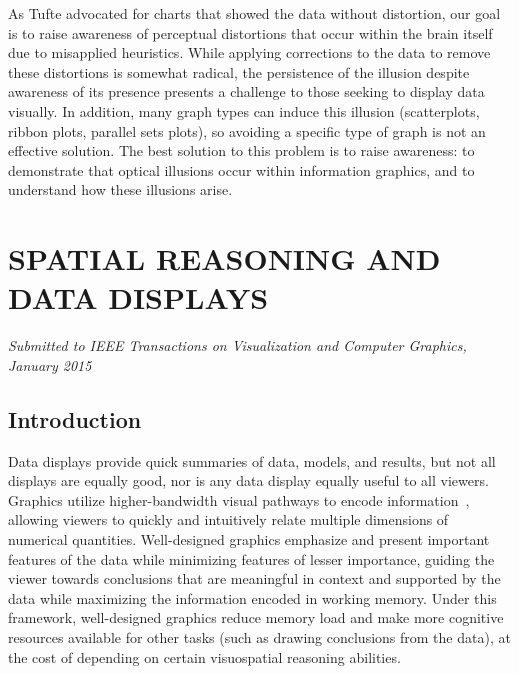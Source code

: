 \documentclass[11pt]{isuthesis}\usepackage[]{graphicx}\usepackage[]{color}
\begin{document}
As Tufte advocated for charts that showed the data without distortion, our goal is to raise awareness of perceptual distortions that occur within the brain itself due to misapplied heuristics. While applying corrections to the data to remove these distortions is somewhat radical, the persistence of the illusion despite awareness of its presence presents a challenge to those seeking to display data visually. In addition, many graph types can induce this illusion (scatterplots, ribbon plots, parallel sets plots), so avoiding a specific type of graph is not an effective solution. The best solution to this problem is to raise awareness: to demonstrate that optical illusions occur within information graphics, and to understand how these illusions arise.  













\graphicspath{{Figure/VisualAptitude/}{../Figure/VisualAptitude/}{Images/VisualAptitude/}{../Images/VisualAptitude/}}
\renewcommand{\floatpagefraction}{.99}




\chapter{SPATIAL REASONING AND DATA DISPLAYS}\label{VisualAptitude}\label{visualreasoning}
\noindent\hfil\textit{Submitted to IEEE Transactions on Visualization and Computer Graphics, January 2015}\hfil

\section{Introduction}
Data displays provide quick summaries of data, models, and results, but not all displays are equally good, nor is any data display equally useful to all viewers. 
Graphics utilize higher-bandwidth visual pathways to encode information~\citep{baddeley1974working}, allowing viewers to quickly and intuitively relate multiple dimensions of numerical quantities.
Well-designed graphics emphasize and present important features of the data while minimizing  features of lesser importance, guiding the viewer towards conclusions that are meaningful in context and supported by the data while maximizing the information encoded in working memory. Under this framework, well-designed graphics reduce memory load and make more cognitive resources available for other tasks (such as drawing conclusions from the data), at the cost of depending on certain visuospatial reasoning abilities. 
\end{document}
